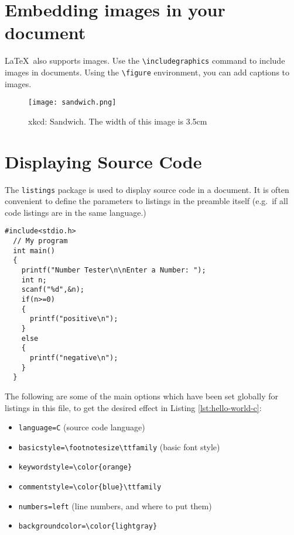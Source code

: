 \documentclass[a4paper,10pt,titlepage]{article}
\begin{document}
\section{Embedding images in your document}
\LaTeX\ also supports images. Use the \verb#\includegraphics# command to include images
in documents. Using the \verb#\figure# environment, you can add
captions to images.
\begin{figure}[h]
  \centering
  \texttt{[image: sandwich.png]}
  \caption{xkcd: Sandwich. The width of this image is 3.5cm}
  \label{fig:sandwich}
\end{figure}

\section{Displaying Source Code}
The \texttt{listings} package is used to display source code in a
document. It is often convenient to define the parameters to listings
in the preamble itself (e.g.~if all code listings are in the same
language.)

\begin{lstlisting}[caption=My C program!,label=lst:hello-world-c]
  #include<stdio.h>
  // My program
  int main()
  {
    printf("Number Tester\n\nEnter a Number: ");
    int n;
    scanf("%d",&n);
    if(n>=0)
    {
      printf("positive\n");
    }
    else
    {
      printf("negative\n");
    }
  }
\end{lstlisting}

\noindent The following are some of the main options which have been
set globally for listings in this file, to get the desired effect in
Listing \ref{lst:hello-world-c}:
\begin{itemize}
\item \verb#language=C# (source code language)
\item \verb#basicstyle=\footnotesize\ttfamily# (basic font style)
\item \verb#keywordstyle=\color{orange}#
\item \verb#commentstyle=\color{blue}\ttfamily#
\item \verb#numbers=left# (line numbers, and where to put them)
\item \verb#backgroundcolor=\color{lightgray}#
\end{itemize}
\end{document}
